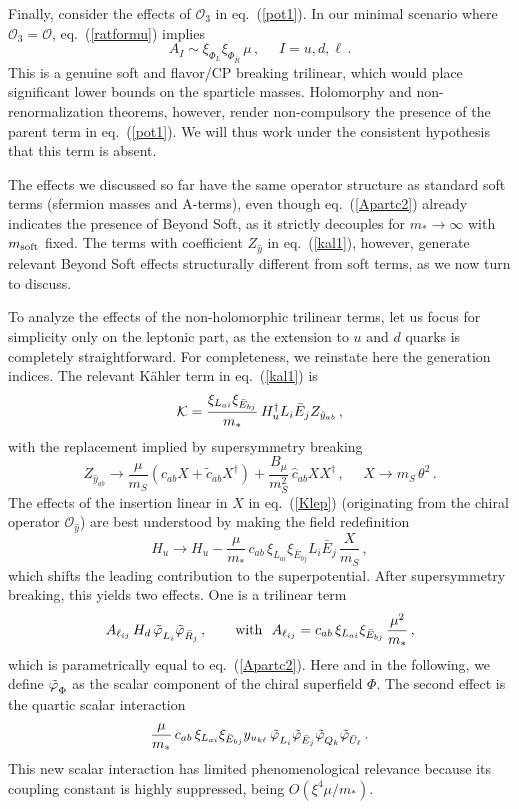 \documentclass[a4paper,12pt]{article}
\newcommand{\beq}{\begin{equation}}
\newcommand{\eeq}{\end{equation}}
\def\eq#1{eq.~(\ref{#1})}
\def\eq#1{eq.~(\ref{#1})}
\def\O{\mathcal{O}}
\def\mst{m_*}
\def\mS{m_S}
\def\msoft{m_{\rm soft}}
\def\scalar#1{{\tilde \varphi}_{\raisebox{-2pt}{$\scriptstyle {#1}$}}}
\begin{document}
Finally, consider the effects of $\O_3$ in \eq{pot1}. In our minimal scenario where $\O_3=\O$,  \eq{ratformu} implies
\beq
A_{I} \sim 
 \xi_{\Phi_{L}} \xi_{\Phi_{\bar R}}\, \mu \, ,~~~~~~I=u,d,\ell \, .
\label{Apartc3}
\eeq
This is a genuine soft and flavor/CP breaking trilinear, which would place significant lower bounds on the sparticle masses. Holomorphy and non-renormalization theorems, however, render non-compulsory the presence of the parent term in \eq{pot1}. We will thus work under the consistent hypothesis that this term is absent.

The effects we discussed so far have the same operator structure as standard soft terms (sfermion masses and A-terms), even though \eq{Apartc2} already indicates the presence of Beyond Soft, as it strictly decouples for $\mst\to \infty$ with $\msoft$ fixed.
The terms  with coefficient $Z_{\hat y}$ in \eq{kal1}, however, generate relevant Beyond Soft effects structurally different from soft terms, as we now turn to discuss.

To analyze the effects of the non-holomorphic trilinear terms, let us focus for simplicity only on the leptonic part, as the extension to $u$ and $d$ quarks is completely straightforward. For completeness, we reinstate here the generation indices. The relevant K\"ahler term in \eq{kal1} is
\beq
{\cal K} = \frac{\xi_{L_{ai}}\xi_{{\bar E}_{bj}}}{\mst}\, H_u^\dagger L_i {\bar E}_jZ_{{\hat y}_{ab}}\, ,
\label{Klep}
\eeq
with the replacement implied by supersymmetry breaking
\beq
Z_{{\hat y}_{ab}}\to\frac{\mu}{\mS}\left( c_{ab}X+{\tilde c}_{ab}X^\dagger \right) + \frac{B_\mu}{\mS^2}\, {\hat c}_{ab} XX^\dagger \, , ~~~~~~X\to \mS\, \theta^2 \, .
\eeq
The effects of the insertion linear in $X$ in \eq{Klep} (originating from the chiral operator $\O_{\hat y}$) are best understood by making the field redefinition
\beq
H_u \to H_u -\frac{\mu}{\mst}\, c_{ab}\, \xi_{L_{ai}}\xi_{{\bar E}_{bj}}L_i {\bar E}_j\, \frac{X}{\mS} \, ,
\eeq
which shifts the leading contribution to the superpotential. After supersymmetry breaking, this yields two effects. One is a trilinear term 
\beq
{A}_{\ell_{ij}}\, H_d \, \scalar{L_i} \scalar{{\bar R}_j} \, ,
~~~~~~\textrm{with}~~A_{\ell_{ij}}=c_{ab}\, \xi_{L_{ai}}\xi_{{\bar E}_{bj}}\, \frac{\mu^2}{\mst} \, ,
\label{holhol}
\eeq
which is parametrically equal to \eq{Apartc2}. Here and in the following, we define $\scalar{\Phi}$ as the scalar component of the chiral superfield $\Phi$. The second effect is the quartic scalar interaction
\beq
\frac{\mu}{\mst}\, c_{ab}\, \xi_{L_{ai}}\xi_{{\bar E}_{bj}}y_{u_{k\ell}}\, \scalar{L_i}\scalar{{\bar E}_j} \scalar{Q_k} \scalar{{\bar U}_\ell} \, .
\eeq
This new scalar interaction has limited phenomenological relevance because its coupling constant is highly suppressed, being $O(\xi^4\mu/\mst)$.
\end{document}
